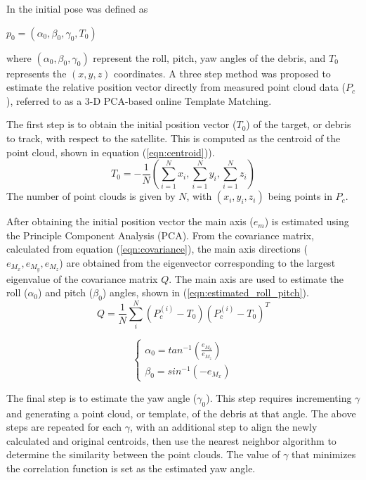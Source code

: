 \documentclass[conference]{IEEEtran}
\begin{document}
		In \cite{2017_pose_pca} the initial pose was defined as 
		
		\centerline{$p_0 = (\alpha_0, \beta_0, \gamma_0, T_0)$}
		
		\noindent where $(\alpha_0, \beta_0, \gamma_0)$ represent the roll, pitch, yaw angles of the debris, and $T_0$ represents the $(x,y,z)$ coordinates. A three step method was proposed to estimate the relative position vector directly from measured point cloud data ($P_c$), referred to as a 3-D PCA-based online Template Matching.
		
		The first step is to obtain the initial position vector ($T_0$) of the target, or debris to track, with respect to the satellite. This is computed as the centroid of the point cloud, shown in equation (\ref{eqn:centroid})).
		\begin{equation}
			\label{eqn:centroid}
			T_0 = -\frac{1}{N} ( \sum_{i=1}^{N} x_i, \sum_{i=1}^{N} y_i, \sum_{i=1}^{N} z_i )
		\end{equation}
		The number of point clouds is given by $N$, with $(x_i, y_i, z_i)$ being points in $P_c$.
		
		After obtaining the initial position vector the main axis ($e_m$) is estimated using the Principle Component Analysis (PCA). From the covariance matrix, calculated from equation (\ref{eqn:covariance}), the main axis directions ($e_{M_x}, e_{M_y}, e_{M_z}$) are obtained from the eigenvector corresponding to the largest eigenvalue of the covariance matrix $Q$. The main axis are used to estimate the roll ($\alpha_0$) and pitch ($\beta_0$) angles, shown in (\ref{eqn:estimated_roll_pitch}).
		\begin{equation}
			\label{eqn:covariance}
			Q = \frac{1}{N} \sum_{i}^{N} (P_c^{(i)} - T_0)(P_c^{(i)} - T_0)^T
		\end{equation}
		
		\begin{equation}
			\label{eqn:estimated_roll_pitch}
			\begin{cases}
				\alpha_0 = tan^{-1}(\frac{e_{M_x}}{e_{M_z}}) \\
				\beta_0 = sin^{-1}(-e_{M_x})
			\end{cases} 
		\end{equation}
	
		The final step is to estimate the yaw angle ($\gamma_0$). This step requires incrementing $\gamma$ and generating a point cloud, or template, of the debris at that angle. The above steps are repeated for each $\gamma$, with an additional step to align the newly calculated and original centroids, then use the nearest neighbor algorithm to determine the similarity between the point clouds. The value of $\gamma$ that minimizes the correlation function is set as the estimated yaw angle.
		
\end{document}

